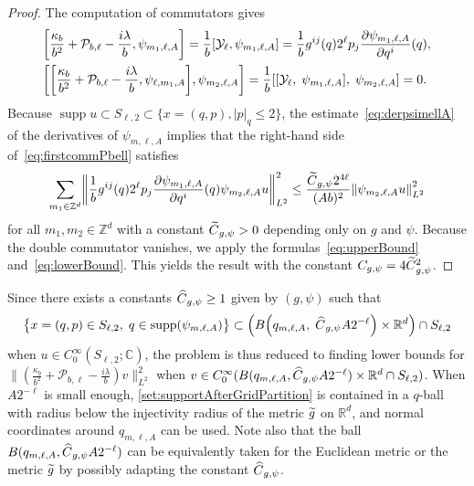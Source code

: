 \documentclass[AHL,Unicode,longabstracts]{cedram}
\newcommand{\C}{\mathbb{C}}
\newcommand{\Z}{\mathbb{Z}}
\newcommand{\R}{\mathbb{R}}
\newcommand{\clY}{\mathcal{Y}}
\newcommand{\clP}{\mathcal{P}}
\DeclareMathOperator{\suppp}{supp}
\newcommand\norm[1]{\left\lVert#1\right\rVert}
\let\oldtilde\tilde
\renewcommand*{\tilde}[1]{\mathchoice{\widetilde{#1}}{\widetilde{#1}}{\oldtilde{#1}}{\oldtilde{#1}}}
\let\oldhat\hat
\renewcommand*{\hat}[1]{\mathchoice{\widehat{#1}}{\widehat{#1}}{\oldhat{#1}}{\oldhat{#1}}}
\let\originalleft\left
\let\originalright\right
\renewcommand{\left}{\mathopen{}\mathclose\bgroup\originalleft}
\renewcommand{\right}{\aftergroup\egroup\originalright}
\begin{document}
\begin{proof}
The computation of commutators gives
\begin{align}\label{eq:firstcommPbell}
& \left[\frac{\kappa_{b}}{b^{2}} + \clP_{b,\ell}-\frac{i\lambda}{b},\psi_{m_{1},\ell,A}\right] = \frac{1}{b}\left[\clY_{\ell},\psi_{m_{1},\ell,A}\right] = \frac{1}{b}g^{ij}(q)2 ^{\ell}p_{j}\frac{\partial \psi_{m_{1},\ell,A}}{\partial q^{i}}(q), \\
& \left[\left[\frac{\kappa_{b}}{b^{2}} + \clP_{b,\ell}-\frac{i\lambda}{b},\psi_{\ell,m_{1},A}\right],\psi_{m_{2},\ell,A}\right] = \frac{1}{b}\left[\left[\clY_{\ell},\;\psi_{m_{1},\ell,A}\right],\;\psi_{m_{2},\ell,A}\right]=0.
\end{align}
Because $\suppp u\subset S_{\ell,2}\subset \{x=(q,p), |p|_q\leq 2\}$, the estimate~\eqref{eq:derpsimellA} of the derivatives of $\psi_{m,\ell,A}$ implies that the right-hand side of~\eqref{eq:firstcommPbell} satisfies
\[
\sum_{m_1\in \Z^d}\norm{\frac{1}{b}g^{ij}(q)2 ^{\ell}p_{j}\frac{\partial \psi_{m_{1},\ell,A}}{\partial q^{i}}(q)\psi_{m_2,\ell,A}u}_{L^2}^2 \leq \frac{\tilde{C}_{g,\psi}2^{4\ell}}{(Ab)^2}\norm{\psi_{m_2,\ell,A}u}_{L^2}^2
\]
for all $m_1,m_2\in \Z^d$ with a constant $\tilde{C}_{g,\psi}>0$ depending only on $g$ and $\psi$. Because the double commutator vanishes, we apply the formulas~\eqref{eq:upperBound} and~\eqref{eq:lowerBound}. This yields the result with the constant $C_{g,\psi}=4\tilde{C}_{g,\psi}^2$.
\end{proof}

Since there exists a constants $\hat{C}_{g,\psi}\geq 1$ given by $(g,\psi)$ such that
\begin{equation}\label{set:supportAfterGridPartition}
\bigl\{ x=(q,p)\in S_{\ell,2},\; q\in \suppp(\psi_{m,\ell,A}) \bigr\}\subset \left(B\left(q_{m,\ell,A},\; \hat{C}_{g,\psi}A2^{-\ell}\right)\times \R^d\right)\cap S_{\ell,2}
\end{equation}
when $u \in C^\infty_0(S_{\ell,2}; \C)$, the problem is thus reduced to finding lower bounds for $\|(\frac{\kappa_{b}}{b^{2}}+\clP_{b,\ell} - \frac{i\lambda}{b}) v\|_{L^2}^2$ when $v \in C^\infty_0 (B (q_{m,\ell,A}, \hat{C}_{g,\psi}A2^{-\ell})\times \R^d \cap S_{\ell,2})$. When $A2^{-\ell}$ is small enough, \eqref{set:supportAfterGridPartition} is contained in a $q$-ball with radius below the injectivity radius of the metric $\tilde{g}$ on $\R^d$, and normal coordinates around $q_{m,\ell,A}$ can be used. Note also that the ball $B(q_{m,\ell,A}, \hat{C}_{g,\psi}A2^{-\ell})$ can be equivalently taken for the Euclidean metric or the metric $\tilde{g}$ by possibly adapting the constant $\hat{C}_{g,\psi}$.
\end{document}
